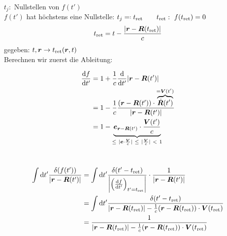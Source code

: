 $ t_j : $ Nullstellen von $ f(t') $\\
$ f(t') $ hat höchstens eine Nullstelle: $ t_j \eqdef t_{\tx{ret}} \qquad t_{\tx{ret}}: \ f(t_{\tx{ret}}) = 0$
\begin{equation*}
t_{\textrm{ret}} = t - \frac{|\bm{r} - \bm{R}(t_{\textrm{ret}}) |}{c}
\end{equation*}
gegeben: $ t , \bm{r} \rightarrow t_{\textrm{ret}}(\bm{r},t) $\\[5pt]
Berechnen wir zuerst die Ableitung:\\
\begin{minipage}{.55\linewidth}
	\begin{align*}
	\prd{f}{t'} &= 1 + \frac{1}{c} \prd{}{t'} |\vec{r} - \vec{R}(t')|\\
	&= 1 - \frac{1}{c} \frac{(\vec{r} - \vec{R}(t')) \cdot \ob{\dot{\vec{R}}(t')}^{=\vec{V}(t')}}{|\vec{r} - \vec{R}(t')|}\\
	&= 1 - \ub{\vec{e}_{\vec{r} - \vec{R}(t')} \cdot \frac{\vec{V}(t')}{c}}_{\le\ |\vec{e} \cdot \frac{\vec{V}}{c}| \ \le \ |\frac{\vec{V}}{c}| \ < \ 1}
	\end{align*}
\end{minipage}%
\begin{minipage}{.45\linewidth}
	\flushright
\end{minipage}%
\\
\begin{align*}
\int \textrm{d} t' \frac{\delta(f(t'))}{|\bm{r} - \bm{R}(t')|} &= \int \textrm{d} t' \frac{\delta(t' - t_{\textrm{ret}})}{\left|\left(\frac{\textrm{d} f}{\textrm{d} t'}\right)_{t' = t_{\textrm{ret}}}\right|} \cdot \frac{1}{| \bm{r} - \bm{R}(t')|}\\
&= \int \textrm{d} t' \frac{\delta(t' - t_{\textrm{ret}})}{|\bm{r} - \bm{R}(t_{\textrm{ret}})| - \frac{1}{c} (\bm{r} - \bm{R}(t_{\textrm{ret}})) \cdot \bm{V}(t_{\textrm{ret}})}\\
&= \frac{1}{|\bm{r} - \bm{R}(t_{\textrm{ret}})| - \frac{1}{c} (\bm{r} - \bm{R}(t_{\textrm{ret}})) \cdot \bm{V}(t_{\textrm{ret}})}
\end{align*}
